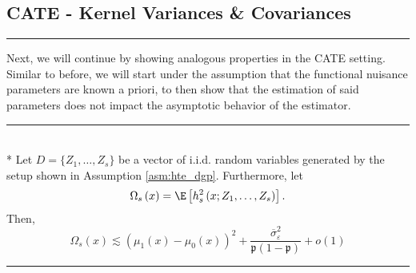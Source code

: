\newpage
\subsection{CATE - Kernel Variances \& Covariances}
\hrule
Next, we will continue by showing analogous properties in the CATE setting.
Similar to before, we will start under the assumption that the functional nuisance parameters are known a priori, to then show that the estimation of said parameters does not impact the asymptotic behavior of the estimator.
\vspace{0.5cm}
\hrule

\begin{lem}\label{lem:CATE_omega_s}\mbox{}\\*
	Let $D = \{Z_1, \dotsc, Z_{s}\}$ be a vector of i.i.d. random variables generated by the setup shown in Assumption \ref{asm:hte_dgp}.
	Furthermore, let
	\begin{equation}
		\Omega_{s}\left(x\right)
		= \E\left[h_{s}^{2}\left(x; Z_1, \ldots,  Z_{s}\right)\right].
	\end{equation}
	Then,
	\begin{equation}
		\Omega_{s}\left(x\right)
		\lesssim \left(\mu_{1}\left(x\right) - \mu_{0}\left(x\right)\right)^2 + \frac{\overline{\sigma}^2_{\varepsilon}}{\mathfrak{p}\left(1 - \mathfrak{p}\right)} + o(1)
	\end{equation}
\end{lem}
\hrule
